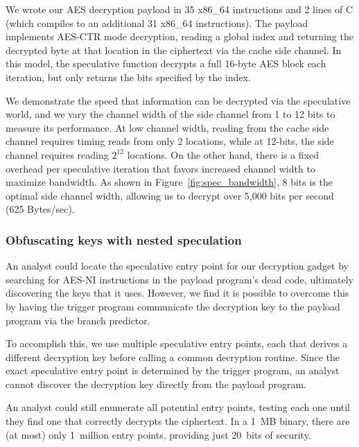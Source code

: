 We wrote our AES decryption payload in 35 x86\_64 instructions and 2 lines of C
(which compiles to an additional 31 x86\_64 instructions). The payload
implements AES-CTR mode decryption, reading a global index and returning the
decrypted byte at that location in the ciphertext via the cache side channel.
In this model, the speculative function decrypts a full 16-byte AES block each
iteration, but only returns the bits specified by the index.

We demonstrate the speed that information can be decrypted via the speculative
world, and we vary the channel width of the side channel from 1 to 12 bits to
measure its performance. At low channel width, reading from the cache side
channel requires timing reads from only 2 locations, while at 12-bits, the side
channel requires reading $2^{12}$ locations. On the other hand, there is a fixed
overhead per speculative iteration that favors increased channel width to maximize
bandwidth. As shown in Figure~\ref{fig:spec_bandwidth}, 8 bits is the optimal
side channel width, allowing us to decrypt over 5,000 bits per second (625
Bytes/sec).


\subsubsection{Obfuscating keys with nested speculation}
\label{subsec:nested-spec}

An analyst could locate the speculative entry point for our
decryption gadget by
searching for AES-NI instructions in the payload program's dead code, ultimately
discovering the keys that it uses. However, we find it is possible to overcome
this by having the trigger program communicate the decryption key to the payload
program via the branch predictor.

To accomplish this, we use multiple speculative entry points, each that derives a
different decryption key before calling a common decryption routine. Since
the exact speculative entry point is determined by the trigger program, an
analyst cannot discover the decryption key directly from the payload program.

An analyst could still enumerate all potential entry points, testing each one
until they find one that correctly decrypts the ciphertext. In a 1~MB binary,
there are (at most) only 1~million entry points, providing just 20~bits of
security.

